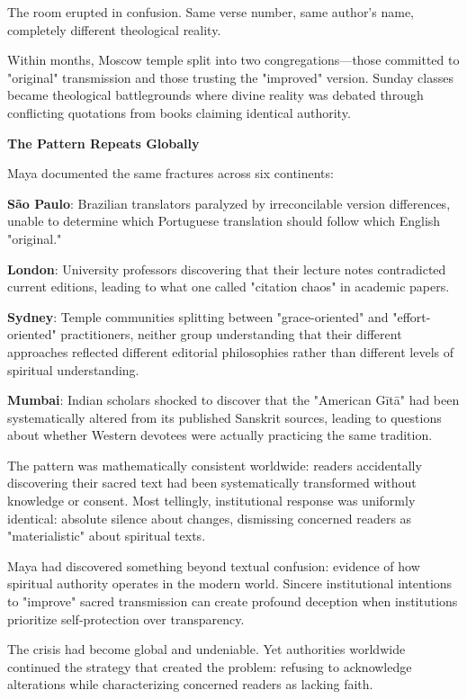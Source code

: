 \documentclass[11pt,twoside]{book}
\begin{document}
The room erupted in confusion. Same verse number, same author's name, completely different theological reality.

Within months, Moscow temple split into two congregations—those committed to "original" transmission and those trusting the "improved" version. Sunday classes became theological battlegrounds where divine reality was debated through conflicting quotations from books claiming identical authority.

\textbf{\textbf{The Pattern Repeats Globally}}

Maya documented the same fractures across six continents:

\textbf{\textbf{São Paulo}}: Brazilian translators paralyzed by irreconcilable version differences, unable to determine which Portuguese translation should follow which English "original."

\textbf{\textbf{London}}: University professors discovering that their lecture notes contradicted current editions, leading to what one called "citation chaos" in academic papers.

\textbf{\textbf{Sydney}}: Temple communities splitting between "grace-oriented" and "effort-oriented" practitioners, neither group understanding that their different approaches reflected different editorial philosophies rather than different levels of spiritual understanding.

\textbf{\textbf{Mumbai}}: Indian scholars shocked to discover that the "American Gītā" had been systematically altered from its published Sanskrit sources, leading to questions about whether Western devotees were actually practicing the same tradition.

The pattern was mathematically consistent worldwide: readers accidentally discovering their sacred text had been systematically transformed without knowledge or consent. Most tellingly, institutional response was uniformly identical: absolute silence about changes, dismissing concerned readers as "materialistic" about spiritual texts.

Maya had discovered something beyond textual confusion: evidence of how spiritual authority operates in the modern world. Sincere institutional intentions to "improve" sacred transmission can create profound deception when institutions prioritize self-protection over transparency.

The crisis had become global and undeniable. Yet authorities worldwide continued the strategy that created the problem: refusing to acknowledge alterations while characterizing concerned readers as lacking faith.
\end{document}

